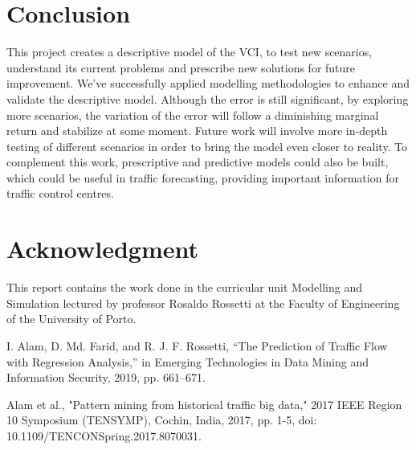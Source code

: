 \documentclass[conference]{IEEEtran}
\begin{document}
\section{Conclusion}
This project creates a descriptive model of the VCI, to test new scenarios, understand its current problems and prescribe new solutions for future improvement. 
We've successfully applied modelling methodologies to enhance and validate the descriptive model. Although the error is still significant, by exploring more scenarios, the variation of the error will follow a diminishing marginal return and stabilize at some moment. 
Future work will involve more in-depth testing of different scenarios in order to bring the model even closer to reality. To complement this work, prescriptive and predictive models could also be built, which could be useful in traffic forecasting, providing important information for traffic control centres.



\section*{Acknowledgment}
This report contains the work done in the curricular unit Modelling and Simulation lectured by professor Rosaldo Rossetti at the Faculty of Engineering of the University of Porto. 
\begin{thebibliography}{1}

I. Alam, D. Md. Farid, and R. J. F. Rossetti, “The Prediction of Traffic Flow with Regression Analysis,” in Emerging Technologies in Data Mining and Information Security, 2019, pp. 661–671.

Alam et al., "Pattern mining from historical traffic big data," 2017 IEEE Region 10 Symposium (TENSYMP), Cochin, India, 2017, pp. 1-5, doi: 10.1109/TENCONSpring.2017.8070031.


\end{thebibliography}




\end{document}

